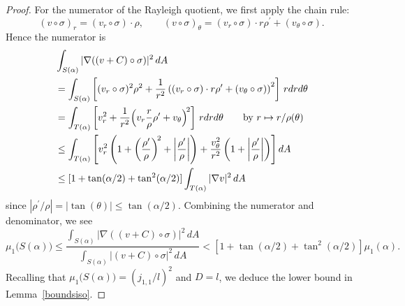 \documentclass[11pt,reqno]{amsart}
\numberwithin{equation}{section}
\begin{document}
\begin{proof}
For the numerator of the Rayleigh quotient, we first apply the chain rule:
\[
(v \circ \sigma)_r = (v_r \circ \sigma) \cdot \rho , \qquad (v \circ \sigma)_\theta = (v_r \circ \sigma)\cdot r \rho^\prime + (v_\theta \circ \sigma) .
\]
Hence the numerator is
\begin{align}
& \int_{S(\alpha)} |\nabla ( (v+C)\circ \sigma)|^2 \, dA \notag \\
& = \int_{S(\alpha)} \left[ (v_r \circ \sigma)^2 \rho^2 + \frac{1}{r^2}\left( (v_r \circ \sigma)\cdot r \rho^\prime + (v_\theta \circ \sigma) \right)^2 \right] \, r drd\theta \notag \\
& = \int_{T(\alpha)} \left[ v_r^2+\frac{1}{r^2}\Big( v_r \frac{r}{\rho} \rho^\prime + v_\theta \Big)^{\! 2} \right] \, r drd\theta \qquad \text{by $r \mapsto r/\rho(\theta)$} \label{eq:varchange} \\
& \leq \int_{T(\alpha)} \left[ v_r^2\left(1+\left(\frac{\rho^\prime}{\rho}\right)^{\! 2}+\left|\frac{\rho^\prime}{\rho}\right|\right)+\frac{v_\theta^2}{r^2}\left(1+\left|\frac{\rho^\prime}{\rho}\right| \right)\right] dA \notag \\
& \leq [1+\tan(\alpha/2)+\tan^2(\alpha/2)] \int_{T(\alpha)} |\nabla v|^2 \, dA \notag
\end{align}
since $|\rho^\prime/\rho|=|\tan(\theta)| \leq \tan(\alpha/2)$. Combining the numerator and denominator, we see
\[
  \mu_1 \big( S(\alpha) \big) \leq \frac{\int_{S(\alpha)} |\nabla ( (v+C)\circ \sigma)|^2 \, dA}{\int_{S(\alpha)} |(v+C)\circ \sigma|^2 \, dA} < [1+\tan(\alpha/2)+\tan^2(\alpha/2)] \mu_1(\alpha).
\]
Recalling that $\mu_1 \big( S(\alpha) \big) = (j_{1,1}/l)^2$ and $D=l$, we deduce the lower bound in Lemma~\ref{boundsiso}.


\end{proof}
\end{document}
